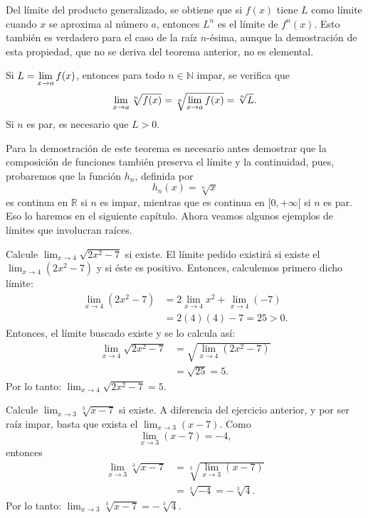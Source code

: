 Del límite del producto generalizado, se obtiene que si $f(x)$ tiene $L$ como límite cuando $x$ se
aproxima al número $a$, entonces $L^n$ es el límite de $f^n(x)$. Esto también es verdadero para el
caso de la raíz $n$-ésima, aunque la demostración de esta propiedad, que no se deriva del teorema
anterior, no es elemental.

\begin{teocal}\label{teol:RaizGeneralizada}%
Si $L = \displaystyle{\lim_{x\to a}f(x)}$, entonces para todo $n\in\mathbb{N}$ impar, se verifica que
\[
\lim_{x\to a}\sqrt[n]{f(x)} = \sqrt[n]{\lim_{x\to a}f(x)} = \sqrt[n]{L}.
\]
Si $n$ es par, es necesario que $L > 0$.
\end{teocal}

Para la demostración de este teorema es necesario antes demostrar que la composición de funciones
también preserva el límite y la continuidad, pues, probaremos que la función $h_n$, definida por
\[
h_n(x) = \sqrt[n]{x}
\]
es continua en $\mathbb{R}$ si $n$ es impar, mientras que es continua en $[0,+\infty[$ si $n$ es
par. Eso lo haremos en el siguiente capítulo. Ahora veamos algunos ejemplos de límites que
involucran raíces.

\begin{exemplo}[Solución]{%
Calcule $\displaystyle \lim_{x\to 4}\sqrt{2x^2 -7}$ si existe.
}%
El límite pedido existirá si existe el $\displaystyle \lim_{x\to 4}(2x^2 -7)$ y si éste es
positivo. Entonces, calculemos primero dicho límite:
\begin{align*}
\lim_{x\to 4}(2x^2 -7) &= 2\lim_{x\to 4}x^2 + \lim_{x\to 4}(-7) \\
&= 2(4)(4)-7 = 25>0.
\end{align*}
Entonces, el límite buscado existe y se lo calcula así:
\begin{align*}
\lim_{x\to 4}\sqrt{2x^2 -7} &= \sqrt{\lim_{x\to 4}(2x^2 -7)} \\
&= \sqrt{25}=5.
\end{align*}
Por lo tanto:
$\displaystyle
\lim_{x\to 4}\sqrt{2x^2 -7}=5$.
\end{exemplo}

\begin{exemplo}[Solución]{%
Calcule $\displaystyle \lim_{x\to 3}\sqrt[3]{x -7}$ si existe.
}%
A diferencia del ejercicio anterior, y por ser raíz impar, basta que exista el $\displaystyle
\lim_{x\to 3}(x -7)$. Como
\[
\lim_{x\to 3}(x-7)=-4,
\]
entonces
\begin{align*}
\lim_{x\to 3}\sqrt[3]{x -7} &= \sqrt[3]{\lim_{x\to 3}(x-7)} \\
&= \sqrt[3]{-4} = -\sqrt[3]{4}.
\end{align*}
Por lo tanto:
$\displaystyle
\lim_{x\to 3}\sqrt[3]{x -7}=-\sqrt[3]{4}$.

\end{exemplo}

